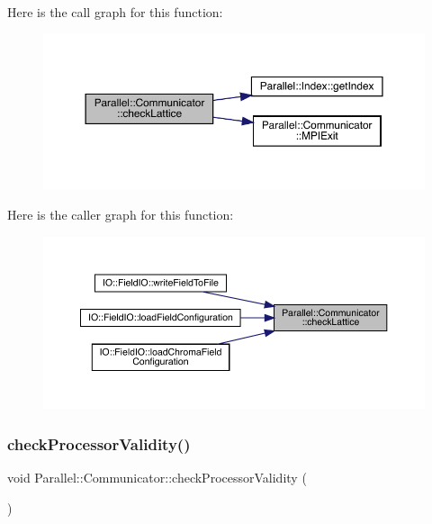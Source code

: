 Here is the call graph for this function\+:\nopagebreak
\begin{figure}[H]
\begin{center}
\leavevmode
\includegraphics[width=350pt]{class_parallel_1_1_communicator_a0975f377dbde235d418ca7054001f3a3_cgraph}
\end{center}
\end{figure}
Here is the caller graph for this function\+:
\nopagebreak
\begin{figure}[H]
\begin{center}
\leavevmode
\includegraphics[width=350pt]{class_parallel_1_1_communicator_a0975f377dbde235d418ca7054001f3a3_icgraph}
\end{center}
\end{figure}
\mbox{\label{class_parallel_1_1_communicator_af507f05e369586d3ffea12d366e972ef}} 
\subsubsection{\texorpdfstring{checkProcessorValidity()}{checkProcessorValidity()}}
{\footnotesize\ttfamily void Parallel\+::\+Communicator\+::check\+Processor\+Validity (\begin{DoxyParamCaption}{ }\end{DoxyParamCaption})\hspace{0.3cm}{\ttfamily [static]}}

